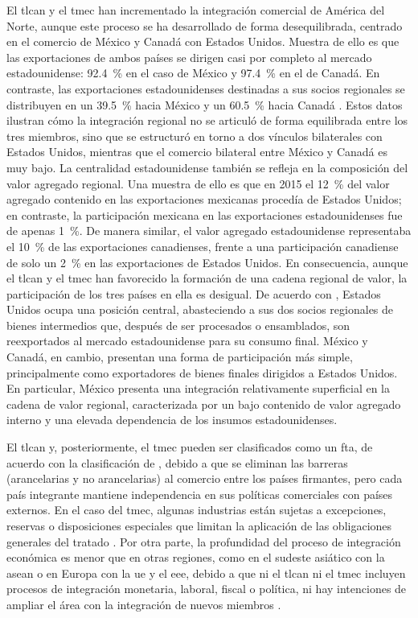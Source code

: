 El \gls{tlcan} y el \gls{tmec} han incrementado la integración comercial de América del Norte, aunque este proceso se ha desarrollado de forma desequilibrada, centrado en el comercio de México y Canadá con Estados Unidos. Muestra de ello es que las exportaciones de ambos países se dirigen casi por completo al mercado estadounidense: 92.4~\% en el caso de México y 97.4~\% en el de Canadá. En contraste, las exportaciones estadounidenses destinadas a sus socios regionales se distribuyen en un 39.5~\% hacia México y un 60.5~\% hacia Canadá \parencite[p.~44]{Murillo2022}. Estos datos ilustran cómo la integración regional no se articuló de forma equilibrada entre los tres miembros, sino que se estructuró en torno a dos vínculos bilaterales con Estados Unidos, mientras que el comercio bilateral entre México y Canadá es muy bajo. 
La centralidad estadounidense también se refleja en la composición del valor agregado regional. Una muestra de ello es que en 2015 el 12~\% del valor agregado contenido en las exportaciones mexicanas procedía de Estados Unidos; en contraste, la participación mexicana en las exportaciones estadounidenses fue de apenas 1~\%. De manera similar, el valor agregado estadounidense representaba el 10~\% de las exportaciones canadienses, frente a una participación canadiense de solo un 2~\% en las exportaciones de Estados Unidos. En consecuencia, aunque el \gls{tlcan} y el \gls{tmec} han favorecido la formación de una cadena regional de valor, la participación de los tres países en ella es desigual. De acuerdo con \textcite{Murillo2022}, Estados Unidos ocupa una posición central, abasteciendo a sus dos socios regionales de bienes intermedios que, después de ser procesados o ensamblados, son reexportados al mercado estadounidense para su consumo final. México y Canadá, en cambio, presentan una forma de participación más simple, principalmente como exportadores de bienes finales dirigidos a Estados Unidos. En particular, México presenta una integración relativamente superficial en la cadena de valor regional, caracterizada por un bajo contenido de valor agregado interno y una elevada dependencia de los insumos estadounidenses.

El \gls{tlcan} y, posteriormente, el \gls{tmec} pueden ser clasificados como un \gls{fta}, de acuerdo con la clasificación de \textcite{Balassa1961}, debido a que se eliminan las barreras (arancelarias y no arancelarias) al comercio entre los países firmantes, pero cada país integrante mantiene independencia en sus políticas comerciales con países externos. En el caso del \gls{tmec}, algunas industrias están sujetas a excepciones, reservas o disposiciones especiales que limitan la aplicación de las obligaciones generales del tratado \parencite[p.~182]{Nagy2025}. Por otra parte, la profundidad del proceso de integración económica es menor que en otras regiones, como en el sudeste asiático con la \gls{asean} o en Europa con la \gls{ue} y el \gls{eee}, debido a que ni el \gls{tlcan} ni el \gls{tmec} incluyen procesos de integración monetaria, laboral, fiscal o política, ni hay intenciones de ampliar el área con la integración de nuevos miembros \parencite[pp.~272--273]{Stanford2019}. 


